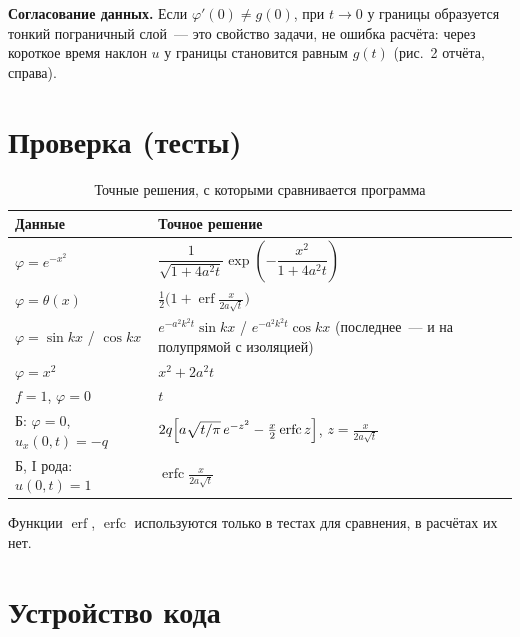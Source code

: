 \documentclass[a4paper,12pt]{article}
\newcommand{\erf}{\operatorname{erf}}
\newcommand{\erfc}{\operatorname{erfc}}
\begin{document}
\textbf{Согласование данных.} Если $\varphi'(0)\ne g(0)$, при $t\to0$ у границы
образуется тонкий пограничный слой~--- это свойство задачи, не ошибка расчёта:
через короткое время наклон $u$ у границы становится равным $g(t)$
(рис.~2 отчёта, справа).

\section{Проверка (тесты)}

\begin{table}[H]
\centering
\caption{Точные решения, с которыми сравнивается программа}
\begin{tabularx}{\textwidth}{@{}l X@{}}
\toprule
Данные & Точное решение\\
\midrule
$\varphi=e^{-x^2}$ & $\dfrac{1}{\sqrt{1+4a^2t}}\exp\!\left(-\dfrac{x^2}{1+4a^2t}\right)$\\
$\varphi=\theta(x)$ & $\frac12\bigl(1+\erf\frac{x}{2a\sqrt t}\bigr)$\\
$\varphi=\sin kx$ / $\cos kx$ & $e^{-a^2k^2t}\sin kx$ / $e^{-a^2k^2t}\cos kx$ (последнее~--- и на полупрямой с изоляцией)\\
$\varphi=x^2$ & $x^2+2a^2t$\\
$f=1$, $\varphi=0$ & $t$\\
Б: $\varphi=0$, $u_x(0,t)=-q$ & $2q\Bigl[a\sqrt{t/\pi}\,e^{-z^2}-\frac{x}{2}\erfc z\Bigr]$, $z=\frac{x}{2a\sqrt t}$\\
Б, I рода: $u(0,t)=1$ & $\erfc\frac{x}{2a\sqrt t}$\\
\bottomrule
\end{tabularx}
\end{table}
Функции $\erf$, $\erfc$ используются только в тестах для сравнения,
в расчётах их нет.

\section{Устройство кода}
\end{document}
